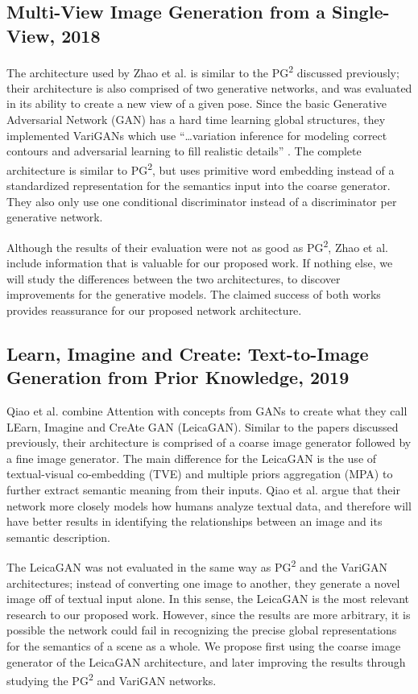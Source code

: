 \documentclass{article}
\begin{document}
\subsection*{Multi-View Image Generation from a Single-View, 2018}
\nocite{multi_view}
The architecture used by Zhao et al. is similar to the PG\textsuperscript{2}
discussed previously; their architecture is also comprised of two generative
networks, and was evaluated in its ability to create a new view of a given pose.
Since the basic Generative Adversarial Network (GAN) has a hard time
learning global structures, they implemented VariGANs which use
``\dots variation inference for modeling correct contours and adversarial
learning to fill realistic details'' \cite{multi_view}. The complete architecture
is similar to PG\textsuperscript{2}, but uses primitive word embedding instead of
a standardized representation for the semantics input into the coarse generator.
They also only use one conditional discriminator instead of a discriminator per
generative network.

Although the results of their evaluation were not as good as
PG\textsuperscript{2}, Zhao et al. include information that is valuable for
our proposed work. If nothing else, we will study the differences between the two
architectures, to discover improvements for the generative models. The claimed
success of both works provides reassurance for our proposed network architecture.

\subsection*{Learn, Imagine and Create: Text-to-Image Generation from Prior Knowledge, 2019}
\nocite{leica}
Qiao et al. combine Attention with concepts from GANs to create what they call
LEarn, Imagine and CreAte GAN (LeicaGAN). Similar to the papers discussed
previously, their architecture is comprised of a coarse image generator followed
by a fine image generator. The main difference for the LeicaGAN is the use
of textual-visual co-embedding (TVE) and multiple priors aggregation (MPA)
to further extract semantic meaning from their inputs. Qiao et al. argue that
their network more closely models how humans analyze textual data, and therefore
will have better results in identifying the relationships between an image and
its semantic description.

The LeicaGAN was not evaluated in the same way as PG\textsuperscript{2} and
the VariGAN architectures; instead of converting one image to another, they
generate a novel image off of textual input alone. In this sense, the LeicaGAN
is the most relevant research to our proposed work. However, since the results
are more arbitrary, it is possible the network could fail in recognizing the
precise global representations for the semantics of a scene as a whole.
We propose first using the coarse image generator of the LeicaGAN architecture,
and later improving the results through studying the PG\textsuperscript{2} and
VariGAN networks.
\end{document}
